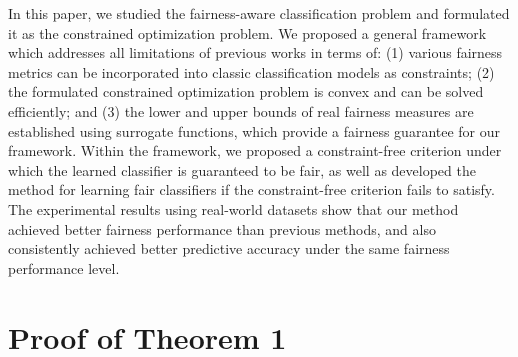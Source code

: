 \documentclass[letterpaper]{article} %
\begin{document}
In this paper, we studied the fairness-aware classification problem and formulated it as the constrained optimization problem. We proposed a general framework which addresses all limitations of previous works in terms of: (1) various fairness metrics can be incorporated into classic classification models as constraints; (2) the formulated constrained optimization problem is convex and can be solved efficiently; and (3) the lower and upper bounds of real fairness measures are established using surrogate functions, which provide a fairness guarantee for our framework. Within the framework, we proposed a constraint-free criterion under which the learned classifier is guaranteed to be fair, as well as developed the method for learning fair classifiers if the constraint-free criterion fails to satisfy. The experimental results using real-world datasets show that our method achieved better fairness performance than previous methods, and also consistently achieved better predictive accuracy under the same fairness performance level. %



\appendix

\section{Proof of Theorem 1}
\end{document}
